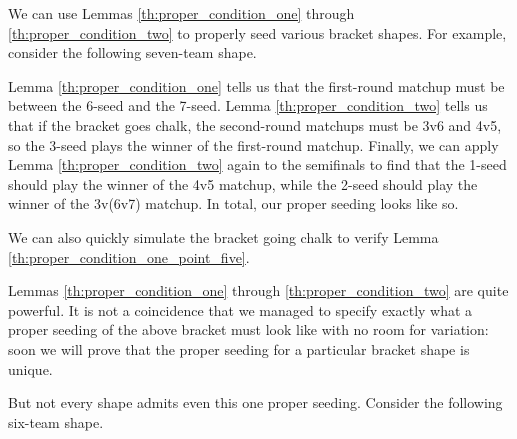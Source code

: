 {    

    We can use Lemmas \ref{th:proper_condition_one} through \ref{th:proper_condition_two} to properly seed various bracket shapes. For example, consider the following seven-team shape.


    Lemma \ref{th:proper_condition_one} tells us that the first-round matchup must be between the 6-seed and the 7-seed. Lemma \ref{th:proper_condition_two} tells us that if the bracket goes chalk, the second-round matchups must be 3v6 and 4v5, so the 3-seed plays the winner of the first-round matchup. Finally, we can apply Lemma \ref{th:proper_condition_two} again to the semifinals to find that the 1-seed should play the winner of the 4v5 matchup, while the 2-seed should play the winner of the 3v(6v7) matchup. In total, our proper seeding looks like so.


    We can also quickly simulate the bracket going chalk to verify Lemma \ref{th:proper_condition_one_point_five}.

    Lemmas \ref{th:proper_condition_one} through \ref{th:proper_condition_two} are quite powerful. It is not a coincidence that we managed to specify exactly what a proper seeding of the above bracket must look like with no room for variation: soon we will prove that the proper seeding for a particular bracket shape is unique. 

    But not every shape admits even this one proper seeding. Consider the following six-team shape.


}
